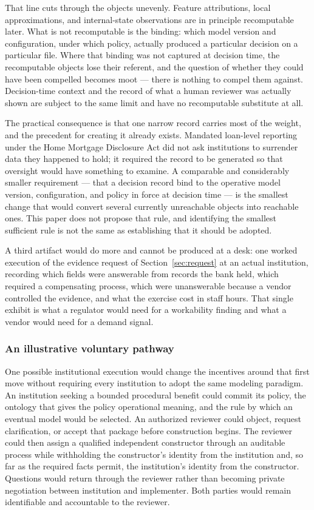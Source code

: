 That line cuts through the objects unevenly. Feature attributions, local
approximations, and internal-state observations are in principle recomputable
later. What is not recomputable is the binding: which model version and
configuration, under which policy, actually produced a particular decision on a
particular file. Where that binding was not captured at decision time, the
recomputable objects lose their referent, and the question of whether they
could have been compelled becomes moot --- there is nothing to compel them
against. Decision-time context and the record of what a human reviewer was
actually shown are subject to the same limit and have no recomputable
substitute at all.

The practical consequence is that one narrow record carries most of the weight,
and the precedent for creating it already exists. Mandated loan-level reporting
under the Home Mortgage Disclosure Act did not ask institutions to surrender
data they happened to hold; it required the record to be generated so that
oversight would have something to examine. A comparable and considerably
smaller requirement --- that a decision record bind to the operative model
version, configuration, and policy in force at decision time --- is the
smallest change that would convert several currently unreachable objects into
reachable ones. This paper does not propose that rule, and identifying the
smallest sufficient rule is not the same as establishing that it should be
adopted.

A third artifact would do more and cannot be produced at a desk: one worked
execution of the evidence request of Section~\ref{sec:request} at an actual
institution, recording which fields were answerable from records the bank held,
which required a compensating process, which were unanswerable because a vendor
controlled the evidence, and what the exercise cost in staff hours. That single
exhibit is what a regulator would need for a workability finding and what a
vendor would need for a demand signal.

\subsubsection{An illustrative voluntary pathway}
\label{sec:uncertainties:first-move:voluntary-pathway}
One possible institutional execution would change the incentives around that
first move without requiring every institution to adopt the same modeling
paradigm. An institution seeking a bounded procedural benefit could commit its
policy, the ontology that gives the policy operational meaning, and the rule by
which an eventual model would be selected. An authorized reviewer could object,
request clarification, or accept that package before construction begins. The
reviewer could then assign a qualified independent constructor through an
auditable process while withholding the constructor's identity from the
institution and, so far as the required facts permit, the institution's identity
from the constructor. Questions would return through the reviewer rather than
becoming private negotiation between institution and implementer. Both parties
would remain identifiable and accountable to the reviewer.

